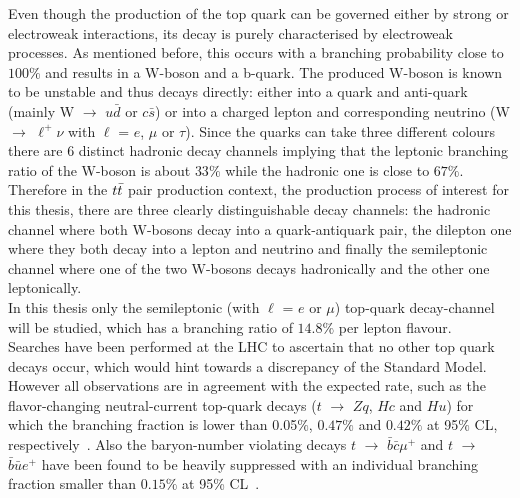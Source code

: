 Even though the production of the top quark can be governed either by strong or electroweak interactions, its decay is purely characterised by electroweak processes. As mentioned before, this occurs with a branching probability close to $100\%$ and results in a W-boson and a b-quark. 
The produced W-boson is known to be unstable and thus decays directly: either into a quark and anti-quark (mainly W $\rightarrow$ $u\bar{d}$ or $c\bar{s}$) or into a charged lepton and corresponding neutrino (W $\rightarrow$ $\ell^{+}\nu$ with $\ell$ = $e$, $\mu$ or $\tau$).
Since the quarks can take three different colours there are 6 distinct hadronic decay channels implying that the leptonic branching ratio of the W-boson is about $33\%$ while the hadronic one is close to $67\%$. %
\\
Therefore in the $t\bar{t}$ pair production context, the production process of interest for this thesis, there are three clearly distinguishable decay channels: the hadronic channel where both W-bosons decay into a quark-antiquark pair, the dilepton one where they both decay into a lepton and neutrino and finally the semileptonic channel where one of the two W-bosons decays hadronically and the other one leptonically. 
\\
In this thesis only the semileptonic (with $\ell$ = $e$ or $\mu$) top-quark decay-channel will be studied, which has a branching ratio of $14.8\%$ per lepton flavour.
\\

Searches have been performed at the LHC to ascertain that no other top quark decays occur, which would hint towards a discrepancy of the Standard Model. However all observations are in agreement with the expected rate, such as the flavor-changing neutral-current top-quark decays ($t$ $\rightarrow$ $Zq$, $Hc$ and $Hu$) for which the branching fraction is lower than 0.05$\%$, $0.47\%$ and $0.42\%$ at 95$\%$ CL, respectively~\cite{CMStZqDecayBR, CMStHqDecayBR}. Also the baryon-number violating decays $t$ $\rightarrow$ $\bar{b}\bar{c}\mu^{+}$ and $t$ $\rightarrow$ $\bar{b}\bar{u} e^{+}$ have been found to be heavily suppressed with an individual branching fraction smaller than $0.15\%$ at 95\% CL~\cite{CMSBNVDecayBR}.
\\

